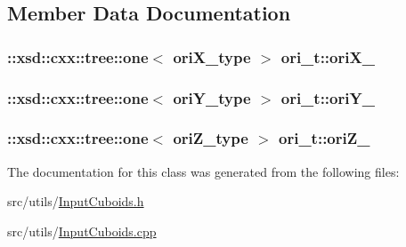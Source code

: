 \subsection{Member Data Documentation}
\hypertarget{classori__t_a4b8bc23c9d2d4c4bcef1de372984b253}{
\subsubsection[{ori\-X\-\_\-}]{\setlength{\rightskip}{0pt plus 5cm}\-::xsd\-::cxx\-::tree\-::one$<$ {\bf ori\-X\-\_\-type} $>$ ori\-\_\-t\-::ori\-X\-\_\-\hspace{0.3cm}{\ttfamily [protected]}}}\label{classori__t_a4b8bc23c9d2d4c4bcef1de372984b253}
\hypertarget{classori__t_a4e86990b10ec0dc34df44c3c944b30a7}{
\subsubsection[{ori\-Y\-\_\-}]{\setlength{\rightskip}{0pt plus 5cm}\-::xsd\-::cxx\-::tree\-::one$<$ {\bf ori\-Y\-\_\-type} $>$ ori\-\_\-t\-::ori\-Y\-\_\-\hspace{0.3cm}{\ttfamily [protected]}}}\label{classori__t_a4e86990b10ec0dc34df44c3c944b30a7}
\hypertarget{classori__t_aa9eb6ef9dc42db7707b805c8624012cb}{
\subsubsection[{ori\-Z\-\_\-}]{\setlength{\rightskip}{0pt plus 5cm}\-::xsd\-::cxx\-::tree\-::one$<$ {\bf ori\-Z\-\_\-type} $>$ ori\-\_\-t\-::ori\-Z\-\_\-\hspace{0.3cm}{\ttfamily [protected]}}}\label{classori__t_aa9eb6ef9dc42db7707b805c8624012cb}


The documentation for this class was generated from the following files\-:\begin{DoxyCompactItemize}
\item 
src/utils/\hyperlink{InputCuboids_8h}{Input\-Cuboids.\-h}\item 
src/utils/\hyperlink{InputCuboids_8cpp}{Input\-Cuboids.\-cpp}\end{DoxyCompactItemize}
